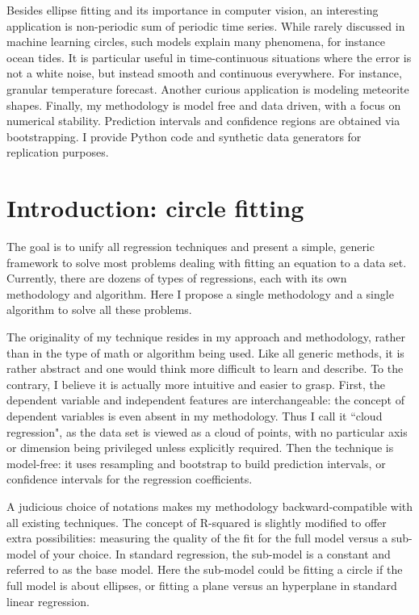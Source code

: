 \documentclass[oneside,10pt]{book}
\begin{document}
Besides ellipse fitting and its importance in \textcolor{index}{computer vision}, an interesting application is non-periodic sum of periodic time series. While rarely discussed in machine learning circles, such models explain many phenomena, for instance ocean tides. It is particular useful in time-continuous situations where the error is not a white noise, but instead smooth and continuous everywhere. For instance, granular temperature forecast.  Another curious application is modeling meteorite shapes. Finally, my methodology is model free and data driven, with a focus on \textcolor{index}{numerical stability}. Prediction intervals and confidence regions
 are obtained via bootstrapping. I provide Python code and \textcolor{index}{synthetic data} generators for replication purposes. 

\hypersetup{linkcolor=red}




\section{Introduction: circle fitting}\label{circ1}

The goal is to unify all regression techniques and present a simple, generic  framework to solve
 most problems dealing with fitting an equation to a data set. Currently, there are dozens of types of regressions, each with its own
 methodology and algorithm. Here I propose a single methodology and a single algorithm to solve all these problems.

The originality of my technique resides in my approach and methodology, rather than in the type of math or algorithm being used. Like all generic methods, it is rather abstract and  one would think more difficult to learn and describe. To the contrary, I believe it is 
 actually more intuitive and easier to grasp. First,
 the dependent variable and independent features are interchangeable: the concept of dependent variables is even absent in my methodology. Thus I call it ``cloud regression", as the data set is viewed as a cloud of points, with no particular axis or dimension being privileged unless explicitly required. 
 Then the technique is model-free: it uses resampling and bootstrap to build prediction intervals, or confidence intervals for the 
 regression coefficients. 

A judicious choice of notations makes my methodology backward-compatible with all existing techniques. The concept of \textcolor{index}{R-squared} is slightly modified  
 to offer extra possibilities: measuring the quality of the fit for the full model versus a sub-model of your choice. 
 In standard regression, the sub-model is a constant and referred to as the base model. Here the sub-model could be fitting a circle if the full model 
 is about ellipses, or fitting a plane versus an hyperplane in standard linear regression.
\end{document}
